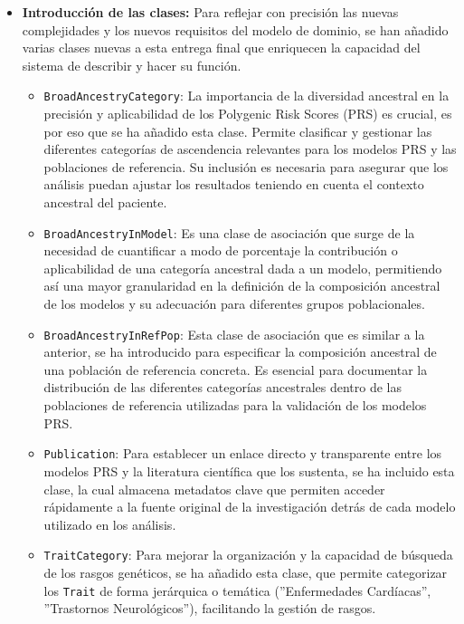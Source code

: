 \begin{itemize}
    \item \textbf{Introducción de las clases:} Para reflejar con precisión las nuevas complejidades y los nuevos requisitos del modelo de dominio, se han añadido varias clases nuevas a esta entrega final que enriquecen la capacidad del sistema de describir y hacer su función.
        \begin{itemize}
        \item \texttt{BroadAncestryCategory}: La importancia de la diversidad ancestral en la precisión y aplicabilidad de los Polygenic Risk Scores (PRS) es crucial, es por eso que se ha añadido esta clase. Permite clasificar y gestionar las diferentes categorías de ascendencia relevantes para los modelos PRS y las poblaciones de referencia. Su inclusión es necesaria para asegurar que los análisis puedan ajustar los resultados teniendo en cuenta el contexto ancestral del paciente.
        
        \item \texttt{BroadAncestryInModel}: Es una clase de asociación que surge de la necesidad de cuantificar a modo de porcentaje la contribución o aplicabilidad de una categoría ancestral dada a un modelo, permitiendo así una mayor granularidad en la definición de la composición ancestral de los modelos y su adecuación para diferentes grupos poblacionales.
        
        \item \texttt{BroadAncestryInRefPop}: Esta clase de asociación que es similar a la anterior, se ha introducido para especificar la composición ancestral de una población de referencia concreta. Es esencial para documentar la distribución de las diferentes categorías ancestrales dentro de las poblaciones de referencia utilizadas para la validación de los modelos PRS.
        
        \item \texttt{Publication}: Para establecer un enlace directo y transparente entre los modelos PRS y la literatura científica que los sustenta, se ha incluido esta clase, la cual almacena metadatos clave que permiten acceder rápidamente a la fuente original de la investigación detrás de cada modelo utilizado en los análisis.
        
        \item \texttt{TraitCategory}: Para mejorar la organización y la capacidad de búsqueda de los rasgos genéticos, se ha añadido esta clase, que permite categorizar los \texttt{Trait} de forma jerárquica o temática (''Enfermedades Cardíacas'', ''Trastornos Neurológicos''), facilitando la gestión de rasgos.
        \end{itemize}
\end{itemize}

